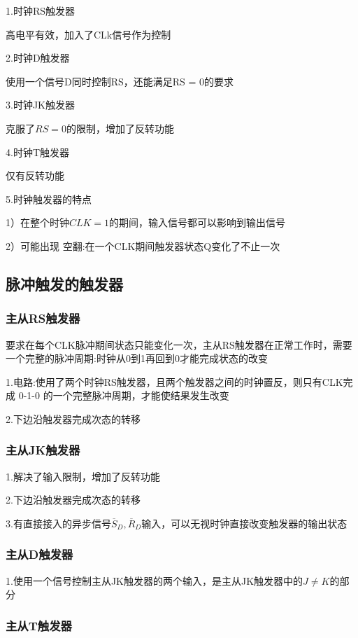 \documentclass[11pt,twoside,a4paper]{ctexart}
\begin{document}
    1.时钟RS触发器

    高电平有效，加入了CLk信号作为控制

    2.时钟D触发器

    使用一个信号D同时控制RS，还能满足RS = 0的要求

    3.时钟JK触发器

    克服了$RS = 0$的限制，增加了反转功能

    4.时钟T触发器

    仅有反转功能

    5.时钟触发器的特点

    1）在整个时钟$CLK = 1$的期间，输入信号都可以影响到输出信号

    2）可能出现 空翻:在一个CLK期间触发器状态Q变化了不止一次

    \subsection{脉冲触发的触发器}

    \subsubsection{主从RS触发器}
    要求在每个CLK脉冲期间状态只能变化一次，主从RS触发器在正常工作时，需要一个完整的脉冲周期:时钟从0到1再回到0才能完成状态的改变

    1.电路:使用了两个时钟RS触发器，且两个触发器之间的时钟置反，则只有CLK完成 0-1-0 的一个完整脉冲周期，才能使结果发生改变

    2.下边沿触发器完成次态的转移

    \subsubsection{主从JK触发器}

    1.解决了输入限制，增加了反转功能

    2.下边沿触发器完成次态的转移

    3.有直接接入的异步信号$\overline{S}_D,\overline{R}_D$输入，可以无视时钟直接改变触发器的输出状态

    \subsubsection{主从D触发器}

    1.使用一个信号控制主从JK触发器的两个输入，是主从JK触发器中的$J \neq K$的部分

    \subsubsection{主从T触发器}
\end{document}
